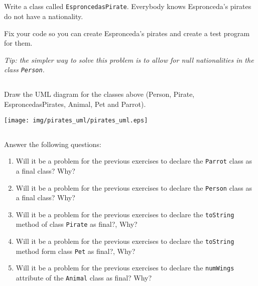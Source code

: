 \documentclass[a4paper, 11pt]{article}
\begin{document}
\subsection{}

Write a class called \verb+EsproncedasPirate+. Everybody knows Espronceda's
pirates do not have a nationality.

Fix your code so you can create Espronceda's pirates and create a test program
for them.


\textsl{Tip: the simpler way to solve this problem is to allow for null
nationalities in the class \texttt{Person}.}









\subsection{}

Draw the UML diagram for the classes above (Person, Pirate, EsproncedasPirates,
Animal, Pet and Parrot).

\begin{solution}
  \centering
    \texttt{[image: img/pirates\_uml/pirates\_uml.eps]}
\end{solution}







\subsection{}

Answer the following questions:

\begin{enumerate}

  \item Will it be a problem for the previous exercises to declare the
    \verb+Parrot+ class as a final class? Why?

  \item Will it be a problem for the previous exercises to declare the
    \verb+Person+ class as a final class? Why?

  \item Will it be a problem for the previous exercises to declare the
    \verb+toString+ method of class \verb+Pirate+ as final?, Why?

  \item Will it be a problem for the previous exercises to declare the
    \verb+toString+ method form class \verb+Pet+ as final?, Why?

  \item Will it be a problem for the previous exercises to declare the
    \verb+numWings+ attribute of the \verb+Animal+ class as final? Why?

\end{enumerate}
\end{document}
